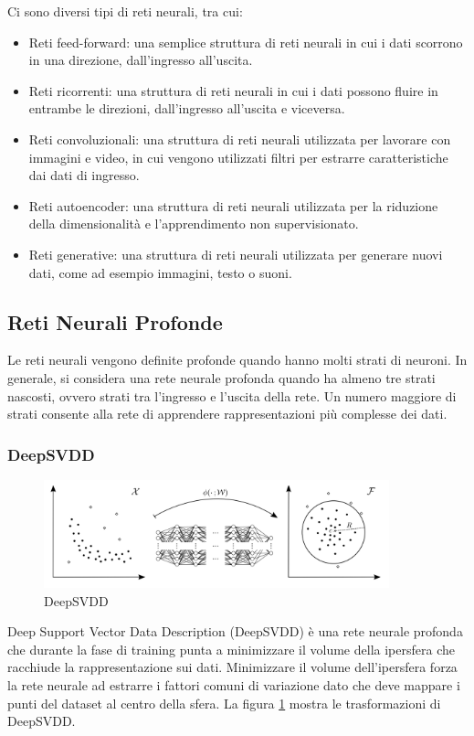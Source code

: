 Ci sono diversi tipi di reti neurali, tra cui:
\begin{itemize}
\item Reti feed-forward: una semplice struttura di reti neurali in cui i dati scorrono in una direzione, dall'ingresso all'uscita.
\item Reti ricorrenti: una struttura di reti neurali in cui i dati possono fluire in entrambe le direzioni, dall'ingresso all'uscita e viceversa.
\item  Reti convoluzionali: una struttura di reti neurali utilizzata per lavorare con immagini e video, in cui vengono utilizzati filtri per estrarre caratteristiche dai dati di ingresso.
\item Reti autoencoder: una struttura di reti neurali utilizzata per la riduzione della dimensionalità e l'apprendimento non supervisionato.
\item Reti generative: una struttura di reti neurali utilizzata per generare nuovi dati, come ad esempio immagini, testo o suoni.
\end{itemize}


\subsection{Reti Neurali Profonde}
Le reti neurali vengono definite profonde quando hanno molti strati di neuroni. In generale, si considera una rete neurale profonda quando ha almeno tre strati nascosti, ovvero strati tra l'ingresso e l'uscita della rete. Un numero maggiore di strati consente alla rete di apprendere rappresentazioni più complesse dei dati.
\subsubsection{DeepSVDD}
\begin{figure}[t]
	\centering
	\includegraphics[width=10cm, scale=1]{images/deepsvdd}
	\caption{DeepSVDD}
	\label{deepsvdd}
\end{figure}

Deep Support Vector Data Description (DeepSVDD) è una rete neurale profonda che durante la fase di training punta a minimizzare il volume della ipersfera che racchiude la rappresentazione sui dati. Minimizzare il volume dell'ipersfera forza la rete neurale ad estrarre i fattori comuni di variazione dato che deve mappare i punti del dataset al centro della sfera.  La figura \ref{deepsvdd} mostra le trasformazioni di DeepSVDD.

